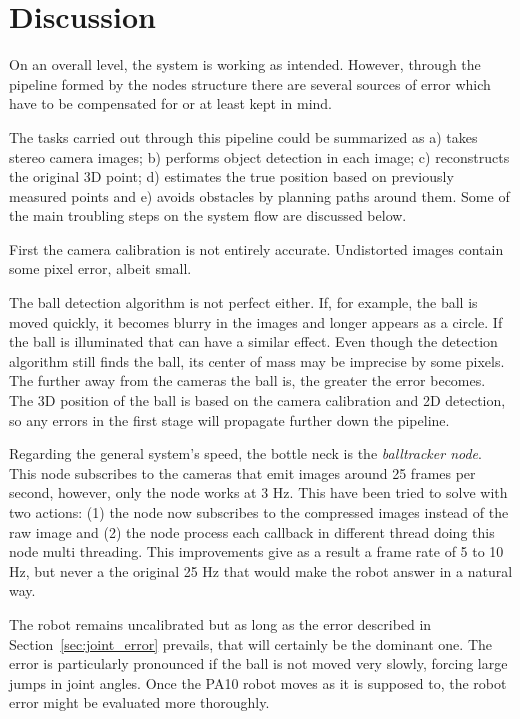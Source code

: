 \chapter{Discussion}
\label{chap:discussion}
On an overall level, the system is working as intended. 
However, through the pipeline formed by the nodes structure there are several sources of error which have to be compensated for or at least kept in mind.

The tasks carried out through this pipeline could be summarized as a) takes stereo camera images; b) performs object detection in each image; c) reconstructs the original 3D point; d) estimates the true position based on previously measured points and e) avoids obstacles by planning paths around them.
Some of the main troubling steps on the system flow are discussed below.

First the camera calibration is not entirely accurate.
Undistorted images contain some pixel error, albeit small.

The ball detection algorithm is not perfect either.
If, for example, the ball is moved quickly, it becomes blurry in the images and longer appears as a circle.
If the ball is illuminated that can have a similar effect.
Even though the detection algorithm still finds the ball, its center of mass may be imprecise by some pixels.
The further away from the cameras the ball is, the greater the error becomes.
The 3D position of the ball is based on the camera calibration and 2D detection, so any errors in the first stage will propagate further down the pipeline.

Regarding the general system's speed, the bottle neck is the \emph{balltracker node}. 
This node subscribes to the cameras that emit images around 25 frames per second, however, only the node works at 3 Hz. 
This have been tried to solve with two actions: (1) the node now subscribes to the compressed images instead of the raw image and (2) the node process each callback in different thread doing this node multi threading. 
This improvements give as a result a frame rate of 5 to 10 Hz, but never a the original 25 Hz that would make the robot answer in a natural way.
 
The robot remains uncalibrated but as long as the error described in Section~\ref{sec:joint_error} prevails, that will certainly be the dominant one. The error is particularly pronounced if the ball is not moved very slowly, forcing large jumps in joint angles. Once the PA10 robot moves as it is supposed to, the robot error might be evaluated more thoroughly.

